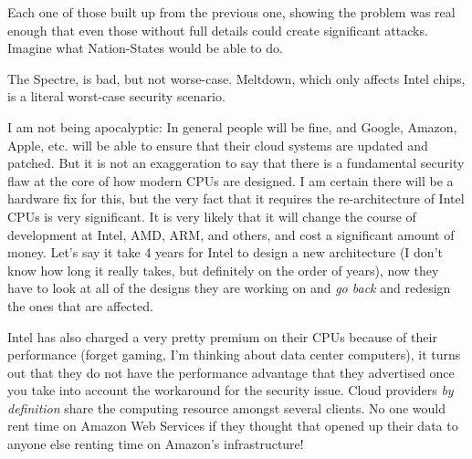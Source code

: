 \documentclass{article}
\begin{document}
Each one of those built up from the previous one, showing the problem was real
enough that even those without full details could create significant attacks.
Imagine what Nation-States would be able to do.

The Spectre, is bad, but not worse-case. Meltdown, which only affects Intel
chips, is a literal worst-case security scenario.

I am not being apocalyptic: In general people will be fine, and Google, Amazon,
Apple, etc. will be able to ensure that their cloud systems are updated and
patched. But it is not an exaggeration to say that there is a fundamental
security flaw at the core of how modern CPUs are designed. I am certain there
will be a hardware fix for this, but the very fact that it requires the
re-architecture of Intel CPUs is very significant. It is very likely that it
will change the course of development at Intel, AMD, ARM, and others, and cost
a significant amount of money. Let's say it take 4 years for Intel to design a
new architecture (I don't know how long it really takes, but definitely on the
order of years), now they have to look at all of the designs they are working
on and \emph{go back} and redesign the ones that are affected.

Intel has also charged a very pretty premium on their CPUs because of their
performance (forget gaming, I'm thinking about data center computers), it turns
out that they do not have the performance advantage that they advertised once
you take into account the workaround for the security issue. Cloud providers
\emph{by definition} share the computing resource amongst several clients. No
one would rent time on Amazon Web Services if they thought that opened up their
data to anyone else renting time on Amazon's infrastructure!
\end{document}
